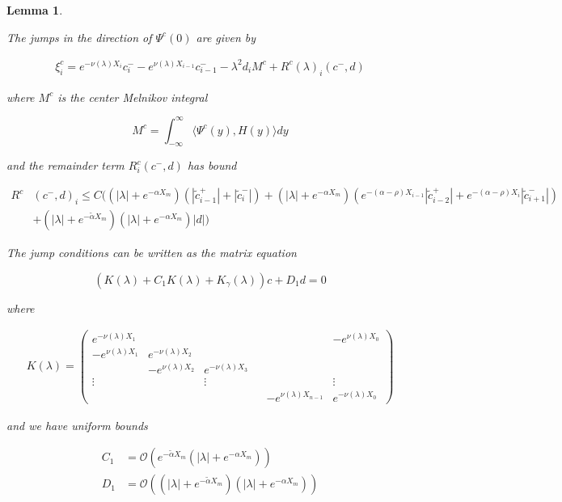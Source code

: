 \documentclass[12pt]{article}
\newtheorem{lemma}{Lemma}
\begin{document}
\begin{lemma}\label{jumpcenteradj}

The jumps in the direction of $\Psi^c(0)$ are given by

\begin{align}\label{xic}
\xi^c_i = e^{-\nu(\lambda) X_i} c_i^- - e^{\nu(\lambda) X_{i-1}} c_{i-1}^- - \lambda^2 d_i M^c + R^c(\lambda)_i(c^-, d)
\end{align}

where $M^c$ is the center Melnikov integral

\begin{equation}\label{Mc}
M^c =  \int_{-\infty}^\infty \langle \Psi^c(y), H(y) \rangle dy 
\end{equation}

and the remainder term $R^c_i(c^-, d)$ has bound

\begin{align}\label{Rc}
R^c&(c^-, d)_i \leq C \Big(
(|\lambda| + e^{-\alpha X_m})(|\tilde{c}_{i-1}^+| + |\tilde{c}_{i}^-|) + (|\lambda| + e^{-\alpha X_m})( e^{-(\alpha - \rho) X_{i-1}} |\tilde{c}_{i-2}^+| + e^{-(\alpha - \rho) X_i} |\tilde{c}_{i+1}^-|)  \\
&+ (|\lambda| + e^{-\tilde{\alpha} X_m})(|\lambda| + e^{-\alpha X_m})|d|
\Big) \nonumber
\end{align}

The jump conditions can be written as the matrix equation

\begin{equation}\label{matrixjumpc}
(K(\lambda) + C_1 K(\lambda) + K_\gamma(\lambda)) c + D_1 d = 0
\end{equation}

where

\begin{align*}
K(\lambda) =  
\begin{pmatrix}
e^{-\nu(\lambda)X_1} & & & & & -e^{\nu(\lambda)X_0} \\
-e^{\nu(\lambda)X_1} & e^{-\nu(\lambda)X_2} \\
& -e^{\nu(\lambda)X_2} & e^{-\nu(\lambda)X_3} \\
\vdots & & \vdots & &&  \vdots \\
& & & & -e^{\nu(\lambda)X_{n-1}} & e^{-\nu(\lambda)X_0} 
\end{pmatrix}
\end{align*}

and we have uniform bounds

\begin{align*}
C_1 &= \mathcal{O}(e^{-\tilde{\alpha} X_m}(|\lambda| + e^{-\alpha X_m})) \\
D_1 &= \mathcal{O}((|\lambda| + e^{-\tilde{\alpha} X_m})(|\lambda| + e^{-\alpha X_m}))
\end{align*}


\end{lemma}
\end{document}
